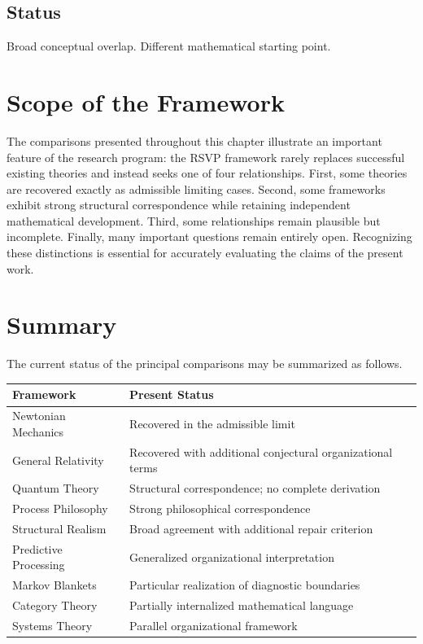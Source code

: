 \documentclass[11pt,oneside]{book}
\numberwithin{equation}{chapter}
\theoremstyle{definition}
\theoremstyle{plain}
\begin{document}
\subsection*{Status}

Broad conceptual overlap. Different mathematical starting point.

\section{Scope of the Framework}

The comparisons presented throughout this chapter illustrate an important feature of the research program: the RSVP framework rarely replaces successful existing theories and instead seeks one of four relationships. First, some theories are recovered exactly as admissible limiting cases. Second, some frameworks exhibit strong structural correspondence while retaining independent mathematical development. Third, some relationships remain plausible but incomplete. Finally, many important questions remain entirely open. Recognizing these distinctions is essential for accurately evaluating the claims of the present work.

\section{Summary}

The current status of the principal comparisons may be summarized as
follows.

\begin{center}
\begin{tabular}{p{5cm}p{7cm}}
\toprule
Framework & Present Status \\
\midrule
Newtonian Mechanics & Recovered in the admissible limit \\
General Relativity & Recovered with additional conjectural organizational
terms \\
Quantum Theory & Structural correspondence; no complete derivation \\
Process Philosophy & Strong philosophical correspondence \\
Structural Realism & Broad agreement with additional repair criterion \\
Predictive Processing & Generalized organizational interpretation \\
Markov Blankets & Particular realization of diagnostic boundaries \\
Category Theory & Partially internalized mathematical language \\
Systems Theory & Parallel organizational framework \\
\bottomrule
\end{tabular}
\end{center}
\end{document}
